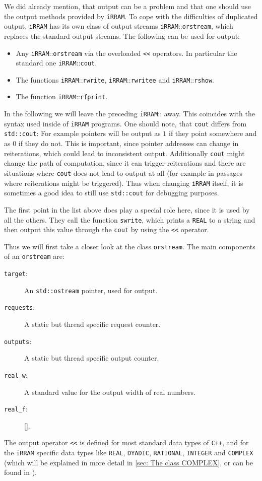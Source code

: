 \documentclass{article}
\newcommand{\irram}{\texttt{iRRAM}\xspace}
\newcommand{\cc}{\texttt{C++}\xspace}
\newcommand{\ir}[1]{\texttt{#1}}
\newcommand{\code}[1]{\texttt{#1}}
\begin{document}
We did already mention, that output can be a problem and that one should use the output methods provided by \irram. To cope with the difficulties of duplicated output, \irram has its own class of output streams \irram::\ir{orstream}, which replaces the standard output streams. The following can be used for output:
\begin{itemize}
\item Any \irram::\ir{orstream} via the overloaded \ir{<<} operators. In particular the standard one \irram::\ir{cout}.
\item The functions \irram::\ir{rwrite}, \irram::\ir{rwritee} and \irram::\ir{rshow}.
\item The function \irram::\ir{rfprint}.
\end{itemize}
In the following we will leave the preceding \irram::\ir{} away. This coincides with the syntax used inside of \irram programs. One should note, that \ir{cout} differs from \code{std::cout}: For example pointers will be output as $1$ if they point somewhere and as $0$ if they do not. This is important, since pointer addresses can change in reiterations, which could lead to inconsistent output. Additionally \ir{cout} might change the path of computation, since it can trigger reiterations and there are situations where \ir{cout} does not lead to output at all (for example in passages where reiterations might be triggered). Thus when changing \irram itself, it is sometimes a good idea to still use \code{std::cout} for debugging purposes.

The first point in the list above does play a special role here, since it is used by all the others. They call the function \ir{swrite}, which prints a \ir{REAL} to a string and then output this value through the \ir{cout} by using the \ir{<<} operator.

Thus we will first take a closer look at the class \ir{orstream}. The main components of an \ir{orstream} are:
\begin{description}
\item[\code{target}:] An \code{std::ostream} pointer, used for output.
\item[\code{requests}:] A static but thread specific request counter.
\item[\code{outputs}:] A static but thread specific output counter.
\item[\code{real\_w}:] A standard value for the output width of real numbers.
\item[\code{real\_f}:] \ref{}.
\end{description}
The output operator \code{<<} is defined for most standard data types of \cc, and for the \irram specific data types like \ir{REAL}, \ir{DYADIC}, \ir{RATIONAL}, \ir{INTEGER} and \ir{COMPLEX} (which will be explained in more detail in \cref{sec: The class COMPLEX}, or can be found in \cite{}).
\end{document}
